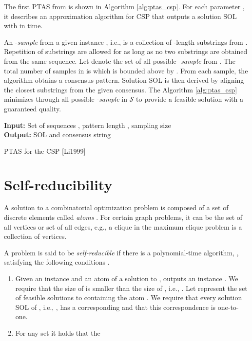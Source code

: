 \documentclass[journal]{acm_proc_article-sp}
\def\S{\ensuremath{\mathcal{S}}\xspace}
\begin{document}
The first PTAS from \cite{Li1999} is shown in Algorithm \ref{alg:ptas_csp}. For each parameter , it describes an approximation algorithm for CSP that outputs a solution SOL with    in  time.

An -\textit{sample} from a given instance , i.e., 
 is a collection of  -length substrings  from .  Repetition of substrings are  allowed for as long as no two substrings are obtained from the same sequence.  Let  denote the set of all possible  -\textit{sample} from .  The total number of 
samples in  is   which is bounded above by .  From each sample, the algorithm obtains a consensus pattern. Solution SOL is then derived by aligning the  closest substrings from the given consensus. The Algorithm \ref{alg:ptas_csp} minimizes  through all possible -\textit{sample} in \S  to provide a feasible solution with a guaranteed quality.

\begin{algorithm}
\textbf{Input:} {Set of sequences , {pattern length} , {sampling size }} \\
\textbf{Output:} {SOL and consensus string } 
\begin{algorithmic}[1]

\State{}
\State{ }
\State{    }
\EndFor
{}
\EndFor
\end{algorithmic}
\caption{PTAS for the CSP [Li1999]}
\label{alg:ptas_csp}
\end{algorithm}

\section{Self-reducibility}  \label{sec:selfreducibility}
A solution to a combinatorial optimization problem is composed of a set of discrete elements called \textit{atoms} \cite{Zych2012}. For certain graph problems, it can be the set of all vertices or set of all edges, e.g., a clique in the maximum clique problem is a collection of vertices.

A problem  is said to be \textit{self-reducible} if there is a polynomial-time algorithm, , satisfying the following conditions \cite{Zych2012}.
\begin{enumerate}
\item Given an instance  and an atom  of a solution to ,  outputs an instance . We require that the size of  is smaller than the size of , i.e., . Let  represent the set of feasible solutions to  containing  the atom . We require that every solution SOL of , i.e., , has a corresponding  and that this correspondence is one-to-one.
\item For any set  it holds that the 

\end{enumerate}
\end{document}
